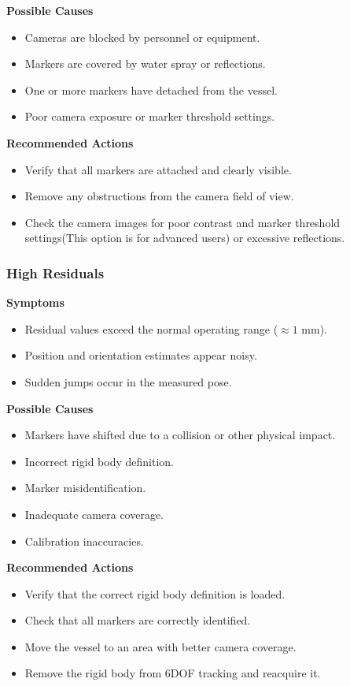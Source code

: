 \documentclass[12pt,a4paper]{article}
\begin{document}
	\textbf{Possible Causes}
	\begin{itemize}
		\item Cameras are blocked by personnel or equipment.
		\item Markers are covered by water spray or reflections.
		\item One or more markers have detached from the vessel.
		\item Poor camera exposure or marker threshold settings. 
	\end{itemize}
	
	\textbf{Recommended Actions}
	\begin{itemize}
		\item Verify that all markers are attached and clearly visible.
		\item Remove any obstructions from the camera field of view.
		\item Check the camera images for poor contrast and marker threshold settings(This option is for advanced users) or excessive reflections.
	\end{itemize}
	
	\subsubsection{High Residuals}
	
	\textbf{Symptoms}
	\begin{itemize}
		\item Residual values exceed the normal operating range ($\approx 1$ mm).
		\item Position and orientation estimates appear noisy.
		\item Sudden jumps occur in the measured pose.
	\end{itemize}
	
	\textbf{Possible Causes}
	\begin{itemize}
		\item Markers have shifted due to a collision or other physical impact.
		\item Incorrect rigid body definition.
		\item Marker misidentification.
		\item Inadequate camera coverage.
		\item Calibration inaccuracies.
	\end{itemize}
	
	\textbf{Recommended Actions}
	\begin{itemize}
		\item Verify that the correct rigid body definition is loaded.
		\item Check that all markers are correctly identified.
		\item Move the vessel to an area with better camera coverage.
		\item Remove the rigid body from 6DOF tracking and reacquire it.
	\end{itemize}
	
\end{document}
